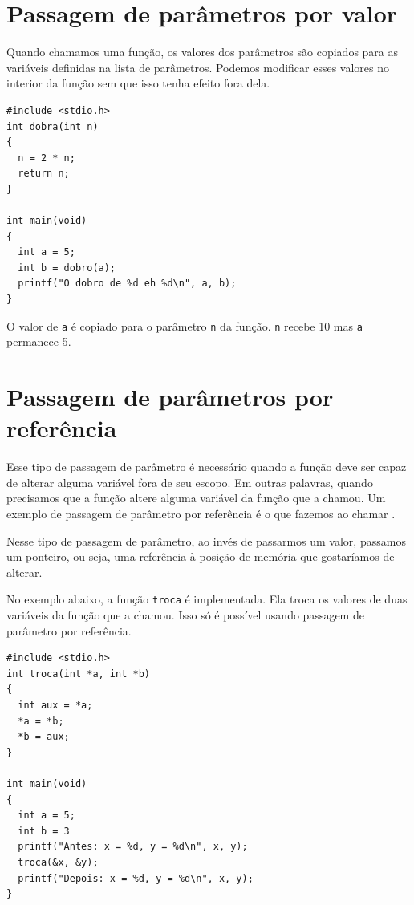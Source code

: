 \section{Passagem de parâmetros por valor}

Quando chamamos uma função, os valores dos parâmetros são copiados para as variáveis definidas na lista de parâmetros. Podemos modificar esses valores no interior da função sem que isso tenha efeito fora dela.

\begin{lstlisting}
#include <stdio.h>
int dobra(int n)
{
  n = 2 * n;
  return n;
}

int main(void)
{
  int a = 5;
  int b = dobro(a);
  printf("O dobro de %d eh %d\n", a, b);
}
\end{lstlisting}

O valor de {\tt a} é copiado para o parâmetro {\tt n} da função. {\tt n} recebe 10 mas {\tt a} permanece 5.

\section{Passagem de parâmetros por referência}

Esse tipo de passagem de parâmetro é necessário quando a função deve ser capaz de alterar alguma variável fora de seu escopo. Em outras palavras, quando precisamos que a função altere alguma variável da função que a chamou. Um exemplo de passagem de parâmetro por referência é o que fazemos ao chamar \SCANF.

Nesse tipo de passagem de parâmetro, ao invés de passarmos um valor, passamos um ponteiro, ou seja, uma referência à posição de memória que gostaríamos de alterar.

No exemplo abaixo, a função {\tt troca} é implementada. Ela troca os valores de duas variáveis da função que a chamou. Isso só é possível usando passagem de parâmetro por referência.

\begin{lstlisting}
#include <stdio.h>
int troca(int *a, int *b)
{
  int aux = *a;
  *a = *b;
  *b = aux;
}

int main(void)
{
  int a = 5;
  int b = 3
  printf("Antes: x = %d, y = %d\n", x, y);
  troca(&x, &y);
  printf("Depois: x = %d, y = %d\n", x, y);
}
\end{lstlisting}


